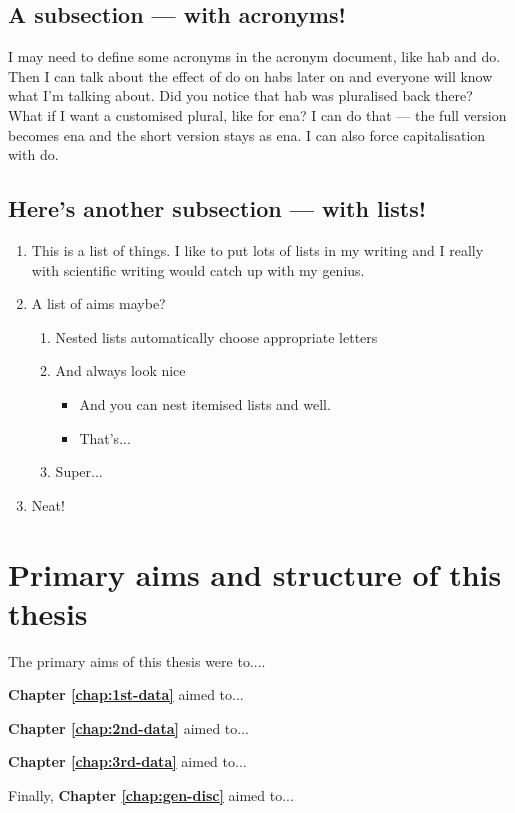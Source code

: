 \subsection{A subsection --- with acronyms!}
I may need to define some acronyms in the acronym document, like \ac{hab} and \ac{do}. Then I can talk about the effect of \ac{do} on \acp{hab} later on and everyone will know what I'm talking about. Did you notice that \ac{hab} was pluralised back there? What if I want a customised plural, like for \ac{ena}? I can do that --- the full version becomes \ac{ena} and the short version stays as \ac{ena}. I can also force capitalisation with \Ac{do}. 

\subsection{Here's another subsection --- with lists!}
\begin{enumerate}
    \item This is a list of things. I like to put lots of lists in my writing and I really with scientific writing would catch up with my genius.
    \item A list of aims maybe?
    \begin{enumerate}
        \item Nested lists automatically choose appropriate letters
        \item And always look nice
        \begin{itemize}
            \item And you can nest itemised lists and well.
            \item That's...
        \end{itemize}
        \item Super...
    \end{enumerate}
    \item Neat!
\end{enumerate}

\section{Primary aims and structure of this thesis}
The primary aims of this thesis were to....

\textbf{Chapter \ref{chap:1st-data}} aimed to...

\textbf{Chapter \ref{chap:2nd-data}} aimed to...

\textbf{Chapter \ref{chap:3rd-data}} aimed to...

Finally, \textbf{Chapter \ref{chap:gen-disc}} aimed to...
